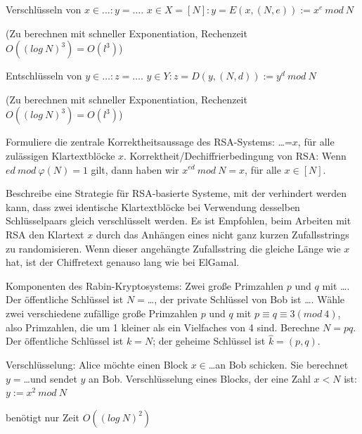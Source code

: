 \documentclass[avery5371, frame]{flashcards}
\begin{document}
\begin{flashcard}{Verschlüsseln von $x\in \dots :y=\dots $.}
    $x\in X= [N]: y=E(x,(N,e)) :=x^e\ mod\ N$

    (Zu berechnen mit schneller Exponentiation, Rechenzeit $O((log\ N)^3) =O(l^3)$)
\end{flashcard}

\begin{flashcard}{Entschlüsseln von $y\in \dots :z=\dots $.}
    $y\in Y: z=D(y,(N,d)) :=y^d\ mod\ N$

    (Zu berechnen mit schneller Exponentiation, Rechenzeit $O((log\ N)^3) =O(l^3)$)
\end{flashcard}

\begin{flashcard}{Formuliere die zentrale Korrektheitsaussage des RSA-Systems: \dots=$x$, für alle zulässigen Klartextblöcke $x$.}
    Korrektheit/Dechiffrierbedingung von RSA: Wenn $ed\ mod\ \varphi(N) = 1$ gilt, dann haben wir $x^{ed}\ mod\ N=x$, für alle $x\in [N]$.
\end{flashcard}

\begin{flashcard}{Beschreibe eine Strategie für RSA-basierte Systeme, mit der verhindert werden kann, dass zwei identische Klartextblöcke bei Verwendung desselben Schlüsselpaars gleich verschlüsselt werden.}
    Es ist Empfohlen, beim Arbeiten mit RSA den Klartext $x$ durch das Anhängen eines nicht ganz kurzen Zufallsstrings zu randomisieren. Wenn dieser angehängte Zufallsstring die gleiche Länge wie $x$ hat, ist der Chiffretext genauso lang wie bei ElGamal.
\end{flashcard}

\begin{flashcard}{Komponenten des Rabin-Kryptosystems: Zwei große Primzahlen $p$ und $q$ mit \dots . Der öffentliche Schlüssel ist $N=$\dots, der private Schlüssel von Bob ist \dots .}
    Wähle zwei verschiedene zufällige große Primzahlen $p$ und $q$ mit $p\equiv q\equiv 3 (mod\ 4)$, also Primzahlen, die um 1 kleiner als ein Vielfaches von 4 sind. Berechne $N=pq$. Der öffentliche Schlüssel ist $k=N$; der geheime Schlüssel ist $\hat{k}= (p,q)$.
\end{flashcard}

\begin{flashcard}{Verschlüsselung: Alice möchte einen Block $x\in$\dots an Bob schicken. Sie berechnet $y=$\dots und sendet $y$ an Bob.}
    Verschlüsselung eines Blocks, der eine Zahl $x<N$ ist: $y:=x^2\ mod\ N$

    benötigt nur Zeit $O((log\ N)^2)$
\end{flashcard}
\end{document}
